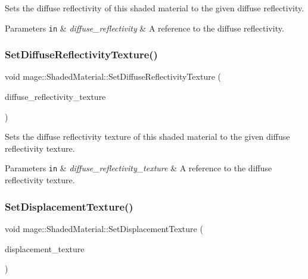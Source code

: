 Sets the diffuse reflectivity of this shaded material to the given diffuse reflectivity.


\begin{DoxyParams}[1]{Parameters}
\mbox{\tt in}  & {\em diffuse\+\_\+reflectivity} & A reference to the diffuse reflectivity. \\
\hline
\end{DoxyParams}
\hypertarget{structmage_1_1_shaded_material_add7475d986df558d289952a6ae2dbd73}{}\label{structmage_1_1_shaded_material_add7475d986df558d289952a6ae2dbd73} 
\subsubsection{\texorpdfstring{Set\+Diffuse\+Reflectivity\+Texture()}{SetDiffuseReflectivityTexture()}}
{\footnotesize\ttfamily void mage\+::\+Shaded\+Material\+::\+Set\+Diffuse\+Reflectivity\+Texture (\begin{DoxyParamCaption}\item[{\hyperlink{namespacemage_a1e01ae66713838a7a67d30e44c67703e}{Shared\+Ptr}$<$ \hyperlink{classmage_1_1_texture}{Texture} $>$}]{diffuse\+\_\+reflectivity\+\_\+texture }\end{DoxyParamCaption})}

Sets the diffuse reflectivity texture of this shaded material to the given diffuse reflectivity texture.


\begin{DoxyParams}[1]{Parameters}
\mbox{\tt in}  & {\em diffuse\+\_\+reflectivity\+\_\+texture} & A reference to the diffuse reflectivity texture. \\
\hline
\end{DoxyParams}
\hypertarget{structmage_1_1_shaded_material_ab96c9ab7165ebb330790b15460b53c3b}{}\label{structmage_1_1_shaded_material_ab96c9ab7165ebb330790b15460b53c3b} 
\subsubsection{\texorpdfstring{Set\+Displacement\+Texture()}{SetDisplacementTexture()}}
{\footnotesize\ttfamily void mage\+::\+Shaded\+Material\+::\+Set\+Displacement\+Texture (\begin{DoxyParamCaption}\item[{\hyperlink{namespacemage_a1e01ae66713838a7a67d30e44c67703e}{Shared\+Ptr}$<$ \hyperlink{classmage_1_1_texture}{Texture} $>$}]{displacement\+\_\+texture }\end{DoxyParamCaption})}

